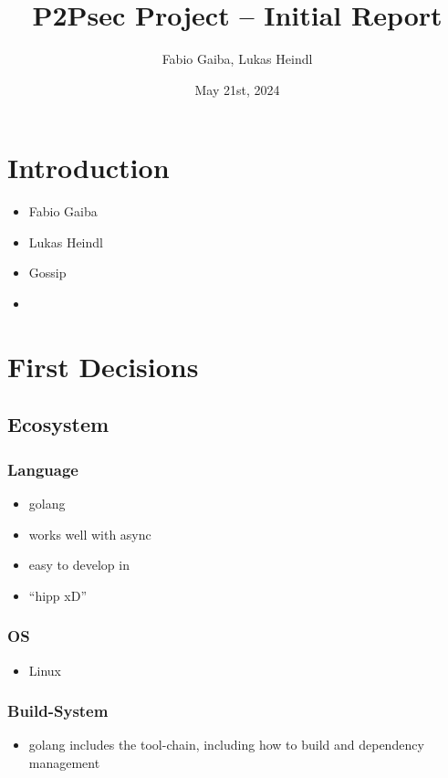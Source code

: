 \documentclass[a4paper,english,10pt,NET]{tumarticle}
\title{P2Psec Project -- Initial Report}
\author{Fabio Gaiba, Lukas Heindl}
\date{May 21st, 2024}
\begin{document}
\maketitle
{}
\thispagestyle{tumarticle}

\section{Introduction}
\begin{itemize}
	\item Fabio Gaiba
	\item Lukas Heindl
	\item Gossip
	\item {}
\end{itemize}

\section{First Decisions}
\subsection{Ecosystem}
\subsubsection{Language}
\begin{itemize}
	\item golang
	\item works well with async
	\item easy to develop in
	\item \enquote{hipp xD}
\end{itemize}

\subsubsection{OS}
\begin{itemize}
	\item Linux 
\end{itemize}

\subsubsection{Build-System}
\begin{itemize}
	\item golang includes the tool-chain, including how to build and dependency management
\end{itemize}
\end{document}
